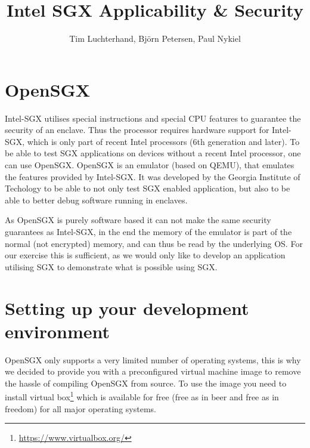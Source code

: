 \documentclass{uulm-assignment}
\title{Intel SGX Applicability \& Security}
\author{Tim Luchterhand, Björn Petersen, Paul Nykiel}
\begin{document}
    \maketitle
    \section{OpenSGX}
    Intel-SGX utilises special instructions and special CPU features to guarantee the security of an enclave.
    Thus the processor requires hardware support for Intel-SGX, which is only part of recent Intel
    processors (6th generation and later). To be able to test SGX applications on devices without a recent
    Intel processor, one can use OpenSGX. OpenSGX is an emulator (based on QEMU), that emulates the features
    provided by Intel-SGX. It was developed by the Georgia Institute of Techology to be able to not only
    test SGX enabled application, but also to be able to better debug software running in enclaves.

    As OpenSGX is purely software based it can not make the same security guarantees as Intel-SGX, in the end
    the memory of the emulator is part of the normal (not encrypted) memory, and can thus be read by the
    underlying OS.
    For our exercise this is sufficient, as we would only like to develop an application utilising SGX to demonstrate
    what is possible using SGX.

    \section{Setting up your development environment}
    OpenSGX only supports a very limited number of operating systems, this is why we decided to provide you with
    a preconfigured virtual machine image to remove the hassle of compiling OpenSGX from source. To use the image
    you need to install virtual box\footnote{\url{https://www.virtualbox.org/}}  which is available for free
    (free as in beer and free as in freedom) for all major operating systems. 
\end{document}
